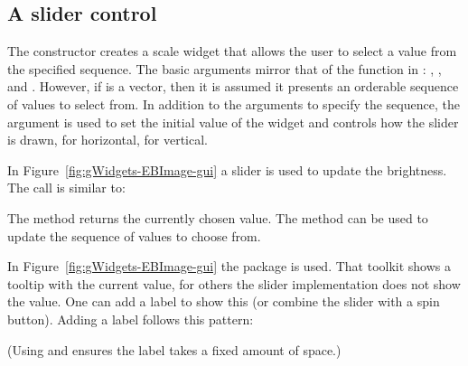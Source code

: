 \subsection{A slider control}
\label{sec:gWidgets-slider-control}

The  constructor creates a scale widget that allows the
user to select a value from the specified sequence.  The basic
arguments mirror that of the  function in \R:
, , and
.  However, if  is a vector, then it is
assumed it presents an orderable sequence of values to select from.
In addition to the arguments to specify the sequence, the argument
 is used to set the initial value of the
widget and  controls how the slider is
drawn,  for horizontal,  for vertical.

In Figure~\ref{fig:gWidgets-EBImage-gui} a slider is used to update
the brightness. The call is similar to:
\begin{Schunk}
\end{Schunk}

The  method returns the currently chosen
value. The \method{[\ASSIGN}{gslider} method can be used to update the
sequence of values to choose from. 


In Figure~\ref{fig:gWidgets-EBImage-gui} the 
package is used. That toolkit shows a tooltip with the current value, for
others the slider implementation does not show the value. One can
add a label to show this (or combine the slider with a spin
button). Adding a label follows this pattern:

\begin{Schunk}
\end{Schunk}
(Using  and  ensures the label takes a
fixed amount of space.)



